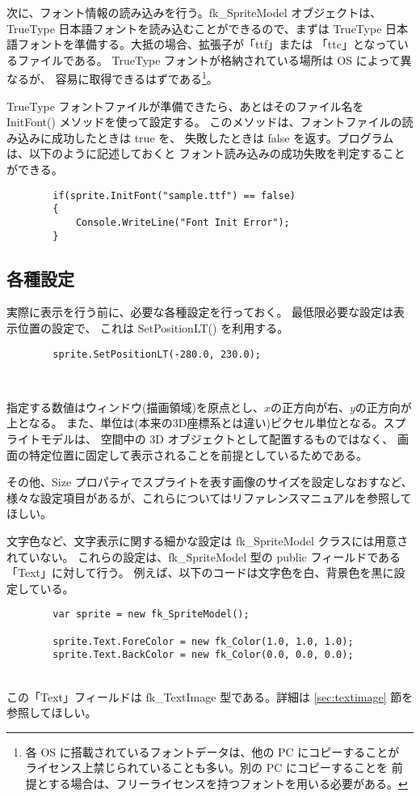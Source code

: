 次に、フォント情報の読み込みを行う。fk\_SpriteModel オブジェクトは、
TrueType 日本語フォントを読み込むことができるので、まずは TrueType
日本語フォントを準備する。大抵の場合、拡張子が「ttf」または
「ttc」となっているファイルである。
TrueType フォントが格納されている場所は OS によって異なるが、
容易に取得できるはずである\footnote{
各 OS に搭載されているフォントデータは、他の PC にコピーすることが
ライセンス上禁じられていることも多い。別の PC にコピーすることを
前提とする場合は、フリーライセンスを持つフォントを用いる必要がある。}。

TrueType フォントファイルが準備できたら、あとはそのファイル名を
InitFont() メソッドを使って設定する。
このメソッドは、フォントファイルの読み込みに成功したときは true を、
失敗したときは false を返す。プログラムは、以下のように記述しておくと
フォント読み込みの成功失敗を判定することができる。
\\
\begin{screen}
\begin{verbatim}
        if(sprite.InitFont("sample.ttf") == false)
        {
            Console.WriteLine("Font Init Error");
        }
\end{verbatim}
\end{screen}
\subsection{各種設定}
実際に表示を行う前に、必要な各種設定を行っておく。
最低限必要な設定は表示位置の設定で、
これは SetPositionLT() を利用する。
\\
\begin{screen}
\begin{verbatim}
        sprite.SetPositionLT(-280.0, 230.0);
\end{verbatim}
\end{screen}
~

指定する数値はウィンドウ(描画領域)を原点とし、\(x\)の正方向が右、\(y\)の正方向が上となる。
また、単位は(本来の3D座標系とは違い)ピクセル単位となる。スプライトモデルは、
空間中の 3D オブジェクトとして配置するものではなく、
画面の特定位置に固定して表示されることを前提としているためである。

その他、Size プロパティでスプライトを表す画像のサイズを設定しなおすなど、
様々な設定項目があるが、これらについてはリファレンスマニュアルを参照してほしい。

文字色など、文字表示に関する細かな設定は fk\_SpriteModel クラスには用意されていない。
これらの設定は、fk\_SpriteModel 型の public フィールドである「Text」に対して行う。
例えば、以下のコードは文字色を白、背景色を黒に設定している。
\\
\begin{screen}
\begin{verbatim}
        var sprite = new fk_SpriteModel();

        sprite.Text.ForeColor = new fk_Color(1.0, 1.0, 1.0);
        sprite.Text.BackColor = new fk_Color(0.0, 0.0, 0.0);
\end{verbatim}
\end{screen}
~ \\
この「Text」フィールドは
fk\_TextImage 型である。詳細は \ref{sec:textimage} 節を参照してほしい。

